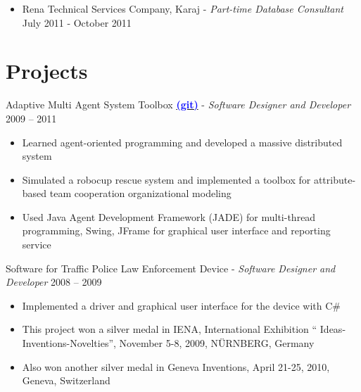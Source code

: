 \documentclass[letter]{res}
\begin{document}
\begin{resume}
\begin{itemize}[leftmargin=-.1in]
  \item Rena Technical Services Company, Karaj \newline
- {\sl Part-time Database Consultant} \hfill July 2011 - October 2011\\
	\vspace{-4mm}

\end{itemize}


\section{Projects}
Adaptive Multi Agent System Toolbox {\href{https://github.com/omid55/team_based_rescue_jade_multi_agent_system}{\textbf{\textcolor{blue}{(git)}}}} \newline
  - {\sl Software Designer and Developer} \hfill 2009 – 2011\\
  \vspace{-4mm}
  \iflong
    \begin{itemize}
    \item Learned agent-oriented programming and developed a massive distributed system
    \item Simulated a robocup rescue system and implemented a toolbox for 				attribute-based team cooperation organizational modeling
    \item Used Java Agent Development Framework (JADE) for multi-thread programming, 		Swing, JFrame for graphical user interface and reporting service
    \end{itemize}
  \fi

Software for Traffic Police Law Enforcement Device \newline
   - {\sl Software Designer and Developer} \hfill 2008 – 2009\\
   \vspace{-4mm}
   \iflong
      \begin{itemize}
        \item Implemented a driver and graphical user interface for the device with C\#
        \item This project won a silver medal in IENA, International Exhibition `` Ideas-Inventions-Novelties'', November 5-8, 2009, N\"{U}RNBERG, Germany
        \item Also won another silver medal in Geneva Inventions, April 21-25, 2010, Geneva, Switzerland
      \end{itemize}
   \fi
   

\end{resume}
\end{document}
